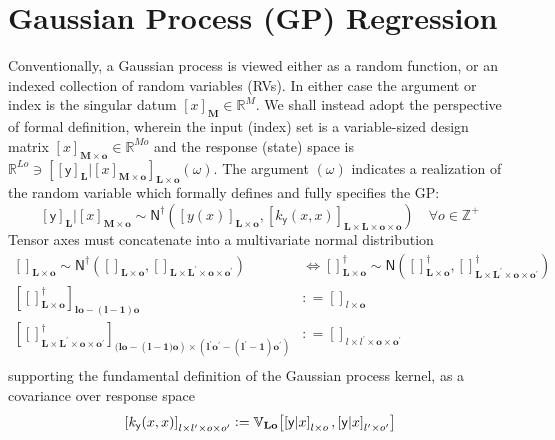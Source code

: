 \documentclass[preprint,12pt]{elsarticle}
\newcommand*{\M}[1]{\ensuremath{#1}\xspace}
\newcommand*{\x}{\times}
\newcommand*{\mi}[1]{\mathbf{#1}}
\newcommand*{\st}[1]{\mathbb{#1}}
\newcommand*{\rv}[1]{\mathsf{#1}}
\newcommand*{\te}[2][]{\left\lbrack{#2}\right\rbrack_{#1}}
\newcommand*{\deq}{\M{\mathrel{\mathop:}=}}
\newcommand*{\cov}[3][]{\ifthenelse{\equal{#1}{}}{\mathbb{V}_{#3}\!\left\lbrack{#2}\right\rbrack}{\mathbb{V}_{#3}\!\left\lbrack{#2,#1}\right\rbrack}}
\newcommand*{\gauss}[2]{\mathsf{N}\!\left({#1,#2}\right)}
\newcommand*{\gaussd}[2]{\mathsf{N}^{\dagger}\!\left({#1,#2}\right)}
\begin{document}
\section{Gaussian Process (GP) Regression} \label{sec:GP}
    Conventionally, a Gaussian process is viewed either as a random function, or an indexed collection of random variables (RVs). In either case the argument or index is the singular datum $\te[\mi{M}]{x}\in\st{R}^M$.
    We shall instead adopt the perspective of formal definition, wherein the input (index) set is a variable-sized design matrix $\te[\mi{M}\x\mi{o}]{x}\in\st{R}^{Mo}$ and the response (state) space is $\st{R}^{Lo}\ni\te[\mi{L}\x\mi{o}]{\te[\mi{L}]{\rv{y}} \vert \te[\mi{M}\x\mi{o}]{x}}(\omega)$. The argument $(\omega)$ indicates a realization of the random variable which formally defines and fully specifies the GP:
    \begin{equation*}
        \te[\mi{L}]{\rv{y}} \big\vert \te[\mi{M}\x\mi{o}]{x} \sim 
        \gaussd{\te[\mi{L}\x\mi{o}]{y(x)}}{\te[\mi{L}\x\mi{L}\x\mi{o}\x\mi{o}]
        {k_{\rv{y}}(x,x)}} \quad \forall o \in \st{Z^{+}}
    \end{equation*}
    Tensor axes must concatenate into a multivariate normal distribution
    \begin{equation*}
        \begin{aligned}
            \te[\mi{L}\x\mi{o}]{} \sim \gaussd{\te[\mi{L}\x\mi{o}]{}}{\te[\mi{L}\x\mi{L^{\prime}}\x\mi{o}\x\mi{o^{\prime}}]{}}
            & \Longleftrightarrow
            \te[\mi{L}\x\mi{o}]{}^{\dagger} \sim \gauss{\te[\mi{L}\x\mi{o}]{}^{\dagger}}{\te[\mi{L}\x\mi{L^{\prime}}\x\mi{o}\x\mi{o^{\prime}}]{}^{\dagger}} \\
            \te[\mi{lo}-\mi{(l-1)o}]{\te[\mi{L}\x\mi{o}]{}^{\dagger}} 
            &\deq \te[l\x\mi{o}]{} \\
            \te[(\mi{lo}-(\mi{l-1)o}) \x (\mi{l^{\prime}o^{\prime}}-\mi{(l^{\prime}-1)o^{\prime}})]
            {\te[\mi{L}\x\mi{L^{\prime}}\x\mi{o}\x\mi{o^{\prime}}]{}^{\dagger}} 
            &\deq \te[l \x l^{\prime}\x\mi{o}\x\mi{o^{\prime}}]{} \\
        \end{aligned}
    \end{equation*}
    supporting the fundamental definition of the Gaussian process kernel, as a covariance over response space
    \begin{equation*}
        \te[l\x l^{\prime}\x o\x o^{\prime}]{k_{\rv{y}}(x,x)} 
        \deq \cov[{\te[l^{\prime}\x o^{\prime}]{\rv{y}\vert x}}]{\te[l\x o]{\rv{y}\vert x}}{\mi{Lo}}
    \end{equation*}
\end{document}
